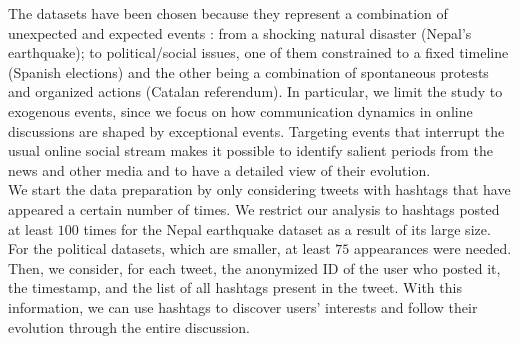  The datasets have been chosen because they represent a combination of unexpected and expected events \cite{lehmann2012dynamical,borge2016dynamics}: from a shocking natural disaster (Nepal's earthquake); to political/social issues, one of them constrained to a fixed timeline (Spanish elections) and the other being a combination of spontaneous protests and organized actions  (Catalan referendum). In particular, we limit the study to exogenous events, since we focus on how communication dynamics in online discussions are shaped by exceptional events.  Targeting events that interrupt the usual online social stream makes it possible to identify salient periods from the news and other media and to have a detailed view of their evolution. \\
 
We start the data preparation by only considering tweets with hashtags that have appeared a certain number of times. We restrict our analysis to hashtags posted at least $100$ times for the Nepal earthquake dataset as a result of its large size. For the political datasets, which are smaller, at least $75$ appearances were needed. Then, we consider, for each tweet, the anonymized ID of the user who posted it, the timestamp, and the list of all hashtags present in the tweet. With this information, we can use hashtags to discover users' interests and follow their evolution  through the entire discussion.  \\
